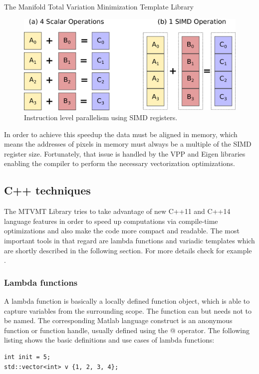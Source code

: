 \begin{chapter}{The Manifold Total Variation Minimization Template Library}
\begin{figure}[h!]
        \centering
	    \includegraphics[width=0.7\linewidth]{./figures/library/SIMD.pdf}
	\caption[SIMD parallelization]{Instruction level parallelism using SIMD registers.
	}
	\label{fig:simd}
\end{figure}

In order to achieve this speedup the data must be aligned in memory, which means the addresses of pixels in memory must always be a multiple of the SIMD register size. Fortunately,
that issue is handled by the VPP and Eigen libraries enabling the compiler to perform the necessary vectorization optimizations.



\subsection{C++ techniques} %
\label{sub:C++ techniques}
The MTVMT Library tries to take advantage of new C++11 and C++14 language features in order to speed up computations via compile-time optimizations and also make the code
more compact and readable. The most important tools in that regard are lambda functions and variadic templates which are shortly described in the following section.
For more details check for example \cite{CPPEleven}.

\subsubsection{Lambda functions} %
\label{ssub:Lambda functions}
A lambda function is basically a locally defined function object, which is able to capture variables from the surrounding scope. The function can but needs not to be named.
The corresponding Matlab language construct is an anonymous function or function handle, usually defined using the @ operator. The following listing
shows the basic definitions and use cases of lambda functions:\\

\cppinline
\begin{lstlisting}[label=code:lambdafun,caption={Lambda functions}]
int init = 5;
std::vector<int> v {1, 2, 3, 4};


\end{lstlisting}
\end{chapter}
